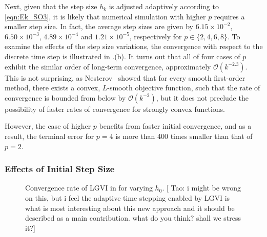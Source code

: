\documentclass[letterpaper, 10pt, conference]{ieeeconf}
\newcommand{\TODO}[1]{\vspace{0.1cm}\newline\fbox{\parbox{0.97\columnwidth}{\textbf{TODO:} #1 }}\vspace*{0.1cm}\newline}
\newcommand{\tao}[1]{[{\color{blue} Tao: #1}]}
\begin{document}
Next, given that the step size $h_k$ is adjusted adaptively according to \eqref{eqn:Ek_SO3}, it is likely that numerical simulation with higher $p$ requires a smaller step size. 
In fact, the average step sizes are given by $6.15\times10^{-2}$, $6.50\times 10^{-3}$, $4.89\times10^{-4}$ and $1.21\times 10^{-5}$, respectively for $p\in\{2,4,6,8\}$. 
To examine the effects of the step size variations, the convergence with respect to the discrete time step is illustrated in .(b).
It turns out that all of four cases of $p$ exhibit the similar order of long-term convergence, approximately $\mathcal{O}(k^{-2.3})$. This is not surprising, as Nesterov~\cite{nesterov2003introductory} showed that for every smooth first-order method, there exists a convex, $L$-smooth objective function, such that the rate of convergence is bounded from below by $\mathcal{O}(k^{-2})$, but it does not preclude the possibility of faster rates of convergence for strongly convex functions.

However, the case of higher $p$ benefits from faster initial convergence, and as a result, the terminal error for $p=4$ is more than 400 times smaller than that of $p=2$.

\subsubsection{Effects of Initial Step Size}

\begin{figure}
    \centerline{
    }
    \centerline{
    }
    \caption{Convergence rate of LGVI in  for varying $h_0$. \tao{i might be wrong on this, but i feel the adaptive time stepping enabled by LGVI is what is most interesting about this new approach and it should be described as a main contribution. what do you think? shall we stress it?}} \label{fig:conv_h}
\end{figure}
\end{document}
